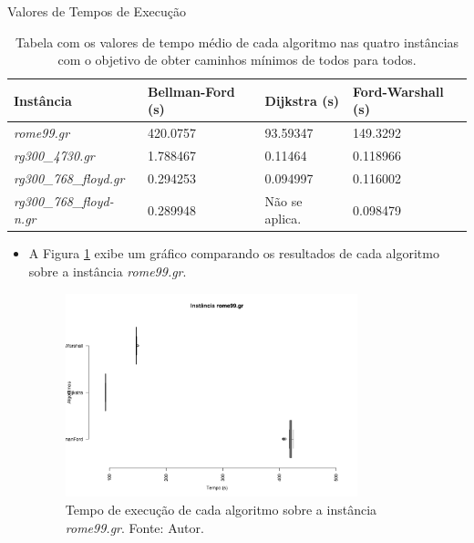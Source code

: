 \documentclass[aspectratio=169]{beamer}
\begin{document}
	\begin{frame}{Valores de Tempos de Execução}
		\begin{table}[H]
			\centering
			\caption{Tabela com os valores de tempo médio de cada algoritmo nas quatro instâncias com o objetivo de obter caminhos mínimos de todos para todos.}
			{\footnotesize 
			
			\begin{tabular}{l|lll}
				\hline
				\textbf{Instância} & \textbf{Bellman-Ford (s)} & \textbf{Dijkstra (s)} & \textbf{Ford-Warshall (s)} \\ \hline \hline
				\textit{ rome99.gr}         & 420.0757                           & 93.59347                          & 149.3292                            \\
				\textit{ rg300\_4730.gr}         & 1.788467                           & 0.11464                          & 0.118966                            \\
				\textit{ rg300\_768\_floyd.gr}         & 0.294253                           & 0.094997                          & 0.116002                            \\
				\textit{ rg300\_768\_floyd-n.gr}    & 0.289948  & Não se aplica.                              & 0.098479                            \\ \hline
			\end{tabular}	
			}
		\end{table}
	\end{frame}
	
	
	\begin{frame}{}
		\begin{itemize}
			\item A Figura \ref{fig:rome} exibe um gráfico comparando os resultados de cada algoritmo sobre a instância \textit{rome99.gr}.
			
			\begin{figure}[H]
				\centering
				\includegraphics[width=0.8\textwidth]{img/rome99.png}
				\caption{Tempo de execução de cada algoritmo sobre a instância \textit{rome99.gr}. Fonte: Autor.}
				\label{fig:rome}
			\end{figure}
		\end{itemize}
	\end{frame}
	
\end{document}
